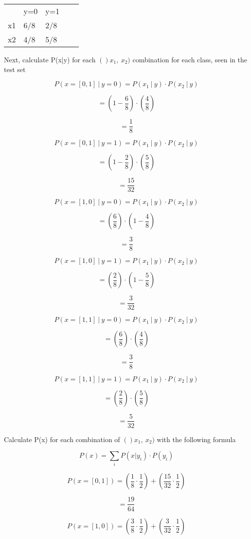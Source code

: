 \documentclass{article}
\begin{document}
\begin{table}[h]
	\centering
\begin{tabular}{lllll}
       &   y=0 &  y=1 \\
   x1  &  6/8  &  2/8\\
   x2  &  4/8  &  5/8
\end{tabular}
\end{table}

Next, calculate P(x|y) for each $()x_1,\ x_2)$ combination for each class, seen in the test set

$$ P(x=[0,1]\ |\ y=0) = P(x_1\ |\ y)\cdot P(x_2\ |\ y)$$

$$ = \left(1 - \frac{6}{8}\right)\cdot \left(\frac{4}{8}\right) $$

$$ = \frac{1}{8} $$

$$ P(x=[0,1]\ |\ y=1) = P(x_1\ |\ y)\cdot P(x_2\ |\ y)$$

$$ = \left(1 - \frac{2}{8}\right)\cdot \left(\frac{5}{8}\right) $$

$$ = \frac{15}{32} $$

$$ P(x=[1,0]\ |\ y=0) = P(x_1\ |\ y)\cdot P(x_2\ |\ y)$$

$$ = \left(\frac{6}{8}\right)\cdot \left(1 - \frac{4}{8}\right) $$

$$ = \frac{3}{8} $$

$$ P(x=[1,0]\ |\ y=1) = P(x_1\ |\ y)\cdot P(x_2\ |\ y)$$

$$ = \left(\frac{2}{8}\right)\cdot \left(1 - \frac{5}{8}\right) $$

$$ = \frac{3}{32} $$

$$ P(x=[1,1]\ |\ y=0) = P(x_1\ |\ y)\cdot P(x_2\ |\ y)$$

$$ = \left(\frac{6}{8}\right)\cdot \left(\frac{4}{8}\right) $$

$$ = \frac{3}{8} $$

$$ P(x=[1,1]\ |\ y=1) = P(x_1\ |\ y)\cdot P(x_2\ |\ y)$$

$$ = \left(\frac{2}{8}\right)\cdot \left(\frac{5}{8}\right) $$

$$ = \frac{5}{32} $$

Calculate P(x) for each combination of  $()x_1,\ x_2)$ with the following formula

$$ P(x) = \sum_i P(x|y_i)\cdot P(y_i) $$

$$ P(x = [0,1]) = \left(\frac{1}{8} \cdot \frac{1}{2}\right) + \left(\frac{15}{32} \cdot \frac{1}{2}\right) $$

$$ = \frac{19}{64} $$

$$ P(x = [1,0]) = \left(\frac{3}{8} \cdot \frac{1}{2}\right) + \left(\frac{3}{32} \cdot \frac{1}{2}\right) $$
\end{document}
